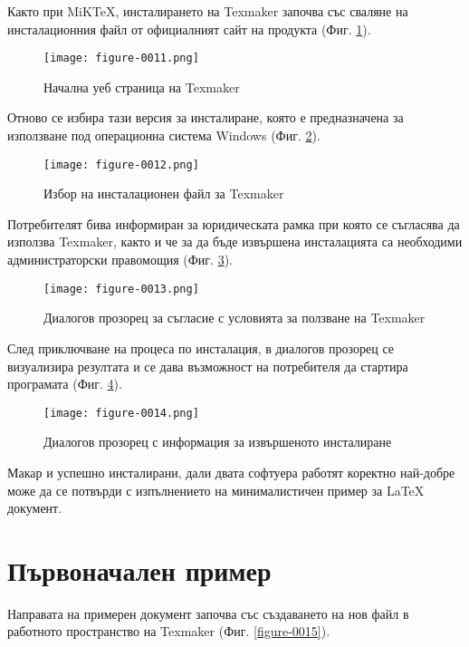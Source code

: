 Както при MiKTeX, инсталирането на Texmaker започва със сваляне на инсталационния файл от официалният сайт на продукта (Фиг. \ref{figure-0011}).

\begin{figure}
  \centering
  \texttt{[image: figure-0011.png]}
  \caption{Начална уеб страница на Texmaker}
\label{figure-0011}
\end{figure}

Отново се избира тази версия за инсталиране, която е предназначена за използване под операционна система Windows (Фиг. \ref{figure-0012}).

\begin{figure}
  \centering
  \texttt{[image: figure-0012.png]}
  \caption{Избор на инсталационен файл за Texmaker}
\label{figure-0012}
\end{figure}

Потребителят бива информиран за юридическата рамка при която се съгласява да използва Texmaker, както и че за да бъде извършена инсталацията са необходими администраторски правомощия (Фиг. \ref{figure-0013}).

\begin{figure}
  \centering
  \texttt{[image: figure-0013.png]}
  \caption{Диалогов прозорец за съгласие с условията за ползване на Texmaker}
\label{figure-0013}
\end{figure}

След приключване на процеса по инсталация, в диалогов прозорец се визуализира резултата и се дава възможност на потребителя да стартира програмата (Фиг. \ref{figure-0014}).

\begin{figure}
  \centering
  \texttt{[image: figure-0014.png]}
  \caption{Диалогов прозорец с информация за извършеното инсталиране}
\label{figure-0014}
\end{figure}

Макар и успешно инсталирани, дали двата софтуера работят коректно най-добре може да се потвърди с изпълнението на минималистичен пример за LaTeX документ.

\section{Първоначален пример}

Направата на примерен документ започва със създаването на нов файл в работното пространство на Texmaker (Фиг. \ref{figure-0015}).

